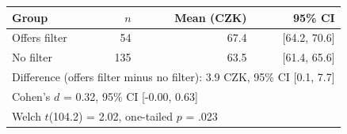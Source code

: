\begin{tabular}{lrrr}
\toprule
Group & $n$ & Mean (CZK) & 95\% CI \\
\midrule
Offers filter &  54 & 67.4 & [64.2, 70.6] \\
No filter & 135 & 63.5 & [61.4, 65.6] \\
\midrule
\multicolumn{4}{l}{Difference (offers filter minus no filter): 3.9 CZK, 95\% CI [0.1, 7.7]} \\
\multicolumn{4}{l}{Cohen's $d$ = 0.32, 95\% CI [-0.00, 0.63]} \\
\multicolumn{4}{l}{Welch $t$(104.2) = 2.02, one-tailed $p$ = .023} \\
\bottomrule
\end{tabular}
